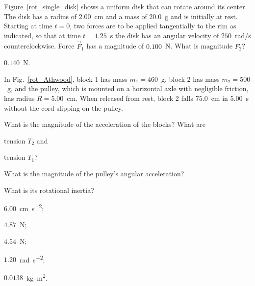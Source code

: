 \begin{problem}\label{prb:rot_single_disk}
	Figure~\ref{rot_single_disk} shows a uniform disk that can rotate around its center. The disk has a radius of $2.00$~cm and a mass of $20.0$~g and is initially at rest. Starting at time $t = 0$, two forces are to be applied tangentially to the rim as indicated, so that at time $t = 1.25$~s the disk has an angular velocity of $250$~rad/s counterclockwise. Force $\vec F_1$ has a magnitude of $0.100$~N. What is magnitude $F_2$?
	\begin{solution}
		$0.140$~\si{\newton}.
	\end{solution}
\end{problem}


\begin{problem}\label{prb:rot_Athwood}
	In Fig.~\ref{rot_Athwood}, block 1 has mass $m_1 = 460$~g, block 2 has mass $m_2 = 500$~g, and the pulley, which is mounted on a horizontal axle with negligible friction, has radius $R = 5.00$~cm. When released from rest, block 2 falls $75.0$~cm in $5.00$~s without the cord slipping on the pulley. 
	\begin{enumerate*}[label=(\alph*)]
		\item What is the magnitude of the acceleration of the blocks?
		What are 
		\item tension $T_2$
		and 
		\item tension $T_1$?
		\item What is the magnitude of the pulley’s angular acceleration?
		\item What is its rotational inertia?
	\end{enumerate*}
	\begin{solution}
		\begin{enumerate*}[label=(\alph*)]
			\item $6.00$~\si{\centi\meter\per\square\second};
			\item $4.87$~\si{\newton}; 
			\item $4.54$~\si{\newton}; 
			\item $1.20$~\si{\radian\per\square\second}; 
			\item $0.0138$~\si{\kilo\gram\square\meter}.
		\end{enumerate*}
	\end{solution}
\end{problem}

